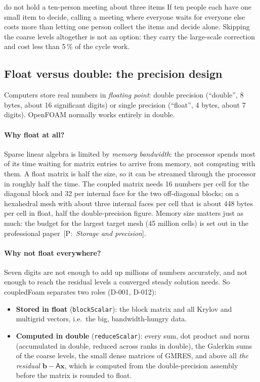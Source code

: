\documentclass[11pt,a4paper]{article}
\newcommand{\vect}[1]{\mathbf{#1}}
\newcommand{\code}[1]{\texttt{#1}}
\newcommand{\pro}[1]{\ {\small[P:~\textit{#1}]}}
\begin{document}
\begin{intuition}{do not hold a ten-person meeting about three items}
  If ten people each have one small item to decide, calling a meeting where
  everyone waits for everyone else costs more than letting one person
  collect the items and decide alone. Skipping the coarse levels altogether
  is not an option: they carry the large-scale correction and cost less
  than 5\,\% of the cycle work.
\end{intuition}

\subsection{Float versus double: the precision design}\label{sec:precision}

Computers store real numbers in \emph{floating point}: double precision
(``double'', 8 bytes, about 16 significant digits) or single precision
(``float'', 4 bytes, about 7 digits). OpenFOAM normally works entirely in
double.

\paragraph{Why float at all?} Sparse linear algebra is limited by
\emph{memory bandwidth}: the processor spends most of its time waiting for
matrix entries to arrive from memory, not computing with them. A float
matrix is half the size, so it can be streamed through the processor in
roughly half the time. The coupled matrix
needs 16 numbers per cell for the diagonal block and 32 per internal face
for the two off-diagonal blocks; on a hexahedral mesh with about three
internal faces per cell that is about 448 bytes per cell in float, half the
double-precision figure. Memory size matters just as much: the budget for
the largest target mesh (45 million cells) is set out in the professional
paper\pro{Storage and precision}.

\paragraph{Why not float everywhere?} Seven digits are not enough to add up
millions of numbers accurately, and not enough to reach the residual levels
a converged steady solution needs. So coupledFoam separates two roles
(D-001, D-012):
\begin{itemize}
\item \textbf{Stored in float} (\code{blockScalar}): the block matrix and all
  Krylov and multigrid vectors, i.e.\ the big, bandwidth-hungry data.
\item \textbf{Computed in double} (\code{reduceScalar}): every sum, dot
  product and norm (accumulated in double, reduced across ranks in double),
  the Galerkin sums of the coarse levels, the small dense matrices of
  GMRES, and above all \emph{the residual $\vect b-\mathsf A\vect x$}, which is
  computed from the double-precision assembly before the matrix is rounded
  to float.
\end{itemize}
\end{document}
